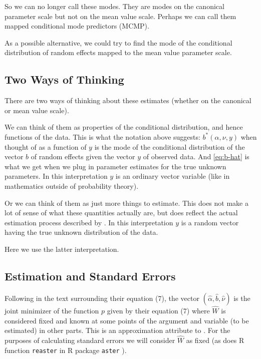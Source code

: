 \documentclass[11pt]{article}
\let\code=\texttt
\begin{document}
So we can no longer call these modes.
They are modes on the canonical parameter scale but not on the mean value
scale.
Perhaps we can call them mapped conditional mode predictors (MCMP).

As a possible alternative, we could try to find the mode of the conditional
distribution of random effects mapped to the mean value parameter scale.

\subsection{Two Ways of Thinking}

There are two ways of thinking about these estimates (whether on the
canonical or mean value scale).

We can think of them as properties
of the conditional distribution, and hence functions of the data.
This is what the notation above suggests: $b^*(\alpha, \nu, y)$ when
thought of as a function of $y$ is the mode of the conditional distribution
of the vector $b$ of random effects given the vector $y$ of observed data.
And \eqref{eq:b-hat} is what we get when we plug in parameter estimates
for the true unknown parameters.  In this interpretation $y$ is an ordinary
vector variable (like in mathematics outside of probability theory).

Or we can think of them as just more things to estimate.  This does not
make a lot of sense of what these quantities actually are, but does reflect
the actual estimation process described by \citet{reaster}.
In this interpretation $y$ is a random vector having the true unknown
distribution of the data.

Here we use the latter interpretation.

\subsection{Estimation and Standard Errors}
\label{sec:m-estimation}

Following \citet{reaster} in the text surrounding their equation (7),
the vector $(\hat{\alpha}, \hat{b}, \hat{\nu})$ is the joint minimizer
of the function $p$ given by their equation (7) where $\widehat{W}$ is
considered fixed and known at some points of the argument and variable
(to be estimated) in other parts.  This is an approximation
\citet{reaster} attribute to \citet{breslow-clayton}.
For the purposes of calculating standard errors we will consider
$\widehat{W}$ as fixed (as does R function \code{reaster} in R package
\code{aster} \citep{aster-package}).
\end{document}
